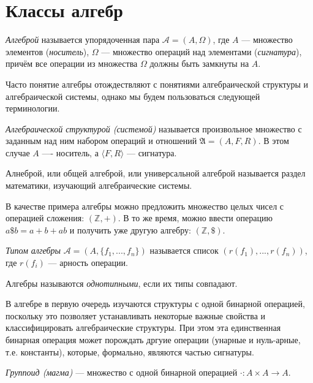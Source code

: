 \section{Классы алгебр}

\begin{definition}
    \textit{Алгеброй} называется упорядоченная пара $\mathcal{A}=(A,\Omega)$, где $A$ --- множество элементов (\textit{носитель}), $\Omega$ --- множество операций над элементами (\textit{сигнатура}), причём все операции из множества $\Omega$ должны быть замкнуты на $A$.
\end{definition}

Часто понятие алгебры отождествляют с понятиями алгебраической структуры и алгебраической системы, однако мы будем пользоваться следующей терминологии.

\begin{definition}
    \textit{Алгебраической структурой (системой)} называется произвольное множество с заданным над ним набором операций и отношений $\mathfrak{A}=(A,F,R)$. В этом случае $A$ ---- носитель, а $\langle F,R \rangle$ --- сигнатура.
\end{definition}

Алнеброй, или общей алгеброй, или универсальной алгеброй называется раздел математики, изучающий алгебраические системы.

В качестве примера алгебры можно предложить множество целых чисел с операцией сложения: $(\mathbb{Z}, +)$. В то же время, можно ввести операцию $a\$b=a+b+ab$ и получить уже другую алгебру: $(\mathbb{Z},\$)$.

\begin{definition}
    \textit{Типом алгебры} $\mathcal{A}=(A, \{f_1,...,f_n\})$ называется список $(r(f_1),...,r(f_n))$, где $r(f_i)$ --- арность операции.
\end{definition}

\begin{definition}
    Алгебры называются \textit{однотипными}, если их типы совпадают.
\end{definition}

В алгебре в первую очередь изучаются структуры с одной бинарной операцией, поскольку это позволяет устанавливать некоторые важные свойства и классифицировать алгебраические структуры. При этом эта единственная бинарная операция может порождать дргуие операции (унарные и нуль-арные, т.е. константы), которые, формально, являются частью сигнатуры.

\begin{definition}
    \textit{Группоид (магма)} --- множество с одной бинарной операцией $\cdot:A\times A \to A$.
\end{definition}

